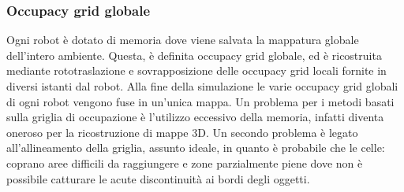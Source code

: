 \subsubsection{Occupacy grid globale}
\label{ssec:globaloccgrid}
Ogni robot è dotato di memoria dove viene salvata la mappatura globale
dell'intero ambiente. Questa, è definita occupacy grid globale, ed è ricostruita
mediante rototraslazione e sovrapposizione delle occupacy grid locali
fornite in diversi istanti dal robot.
Alla fine della simulazione le varie occupacy grid globali di ogni robot vengono
fuse in un'unica mappa.
Un problema per i metodi basati sulla griglia di occupazione è l'utilizzo
eccessivo della memoria, infatti diventa oneroso per la ricostruzione di mappe
3D.
Un secondo problema è legato all'allineamento della griglia, assunto ideale, in
quanto è probabile che le celle: coprano aree difficili da raggiungere e zone
parzialmente piene dove non è possibile catturare le acute discontinuità ai
bordi degli oggetti.
